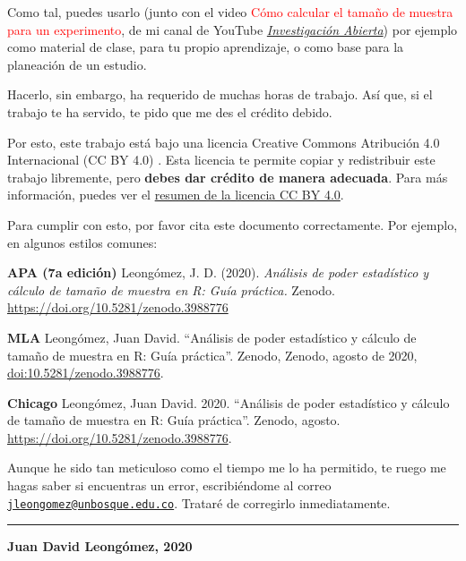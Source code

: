 \documentclass[
]{article}
\begin{document}
Como tal, puedes usarlo (junto con el video
\textcolor{red}{Cómo calcular el tamaño de muestra para un experimento},
de mi canal de YouTube
\href{https://www.youtube.com/user/juanleongomez}{\emph{Investigación
Abierta}}) por ejemplo como material de clase, para tu propio
aprendizaje, o como base para la planeación de un estudio.

Hacerlo, sin embargo, ha requerido de muchas horas de trabajo. Así que,
si el trabajo te ha servido, te pido que me des el crédito debido.

Por esto, este trabajo está bajo una licencia Creative Commons
Atribución 4.0 Internacional (CC BY 4.0) \ccby. Esta licencia te permite
copiar y redistribuir este trabajo libremente, pero \textbf{debes dar
crédito de manera adecuada}. Para más información, puedes ver el
\href{https://creativecommons.org/licenses/by/4.0/deed.es}{resumen de la
licencia CC BY 4.0}.

Para cumplir con esto, por favor cita este documento correctamente. Por
ejemplo, en algunos estilos comunes:

\textbf{APA (7a edición)} \newline Leongómez, J. D. (2020).
\emph{Análisis de poder estadístico y cálculo de tamaño de muestra en R:
Guía práctica.} Zenodo. \url{https://doi.org/10.5281/zenodo.3988776}

\textbf{MLA} \newline Leongómez, Juan David. ``Análisis de poder
estadístico y cálculo de tamaño de muestra en R: Guía práctica''.
Zenodo, Zenodo, agosto de 2020, \url{doi:10.5281/zenodo.3988776}.

\textbf{Chicago} \newline Leongómez, Juan David. 2020. ``Análisis de
poder estadístico y cálculo de tamaño de muestra en R: Guía práctica''.
Zenodo, agosto. \url{https://doi.org/10.5281/zenodo.3988776}.

Aunque he sido tan meticuloso como el tiempo me lo ha permitido, te
ruego me hagas saber si encuentras un error, escribiéndome al correo
\href{mailto:jleongomez@unbosque.edu.co}{\nolinkurl{jleongomez@unbosque.edu.co}}.
Trataré de corregirlo inmediatamente.\newline

\begin{center}\rule{0.5\linewidth}{0.5pt}\end{center}

\begin{center}
\textbf{Juan David Leongómez, 2020} \ccby
\end{center}
\end{document}
